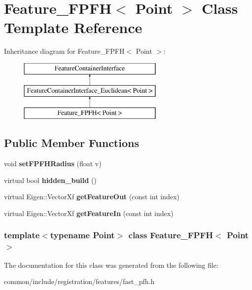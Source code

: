 \hypertarget{classFeature__FPFH}{
\section{Feature\_\-FPFH$<$ Point $>$ Class Template Reference}
\label{classFeature__FPFH}
}
Inheritance diagram for Feature\_\-FPFH$<$ Point $>$:\begin{figure}[H]
\begin{center}
\leavevmode
\includegraphics[height=3.000000cm]{classFeature__FPFH}
\end{center}
\end{figure}
\subsection*{Public Member Functions}
\begin{DoxyCompactItemize}
\item 
\hypertarget{classFeature__FPFH_a887dbacf6719f5f3f11cba62296a8ce2}{
void {\bfseries setFPFHRadius} (float v)}
\label{classFeature__FPFH_a887dbacf6719f5f3f11cba62296a8ce2}

\item 
\hypertarget{classFeature__FPFH_a2119fc178835c76d24c2a36a8266e243}{
virtual bool {\bfseries hidden\_\-build} ()}
\label{classFeature__FPFH_a2119fc178835c76d24c2a36a8266e243}

\item 
\hypertarget{classFeature__FPFH_a420b0023c9aff0b4f9dd6a4f6d885279}{
virtual Eigen::VectorXf {\bfseries getFeatureOut} (const int index)}
\label{classFeature__FPFH_a420b0023c9aff0b4f9dd6a4f6d885279}

\item 
\hypertarget{classFeature__FPFH_afab3991e2d23cb74b93a80880c8cd10d}{
virtual Eigen::VectorXf {\bfseries getFeatureIn} (const int index)}
\label{classFeature__FPFH_afab3991e2d23cb74b93a80880c8cd10d}

\end{DoxyCompactItemize}
\subsubsection*{template$<$typename Point$>$ class Feature\_\-FPFH$<$ Point $>$}



The documentation for this class was generated from the following file:\begin{DoxyCompactItemize}
\item 
common/include/registration/features/fast\_\-pfh.h\end{DoxyCompactItemize}
